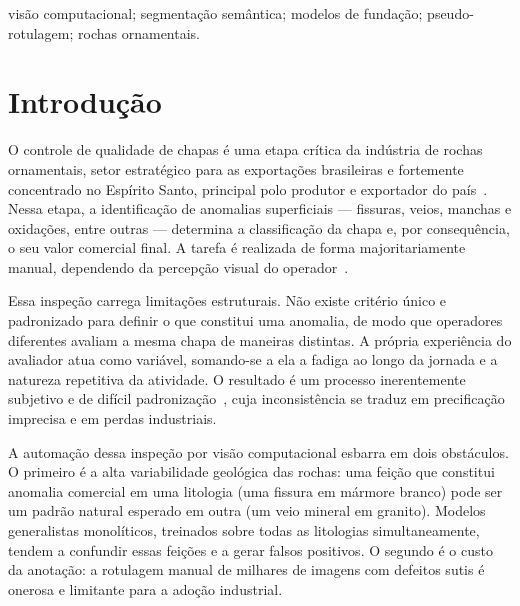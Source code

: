 \documentclass[10pt,conference]{IEEEtran}
\begin{document}
\renewcommand{\IEEEkeywordsname}{Palavras-chave}
\begin{IEEEkeywords}
visão computacional; segmentação semântica; modelos de fundação; pseudo-rotulagem; rochas ornamentais.
\end{IEEEkeywords}

\IEEEpeerreviewmaketitle

\section{Introdução}

O controle de qualidade de chapas é uma etapa crítica da indústria de rochas ornamentais, setor estratégico para as exportações brasileiras e fortemente concentrado no Espírito Santo, principal polo produtor e exportador do país~\cite{stone_economy_bahiense2023}. Nessa etapa, a identificação de anomalias superficiais --- fissuras, veios, manchas e oxidações, entre outras --- determina a classificação da chapa e, por consequência, o seu valor comercial final. A tarefa é realizada de forma majoritariamente manual, dependendo da percepção visual do operador~\cite{stone_inspection_vidal2013}.

Essa inspeção carrega limitações estruturais. Não existe critério único e padronizado para definir o que constitui uma anomalia, de modo que operadores diferentes avaliam a mesma chapa de maneiras distintas. A própria experiência do avaliador atua como variável, somando-se a ela a fadiga ao longo da jornada e a natureza repetitiva da atividade. O resultado é um processo inerentemente subjetivo e de difícil padronização~\cite{stone_subjectivity_castro2018}, cuja inconsistência se traduz em precificação imprecisa e em perdas industriais.

A automação dessa inspeção por visão computacional esbarra em dois obstáculos. O primeiro é a alta variabilidade geológica das rochas: uma feição que constitui anomalia comercial em uma litologia (uma fissura em mármore branco) pode ser um padrão natural esperado em outra (um veio mineral em granito). Modelos generalistas monolíticos, treinados sobre todas as litologias simultaneamente, tendem a confundir essas feições e a gerar falsos positivos. O segundo é o custo da anotação: a rotulagem manual de milhares de imagens com defeitos sutis é onerosa e limitante para a adoção industrial.
\end{document}
